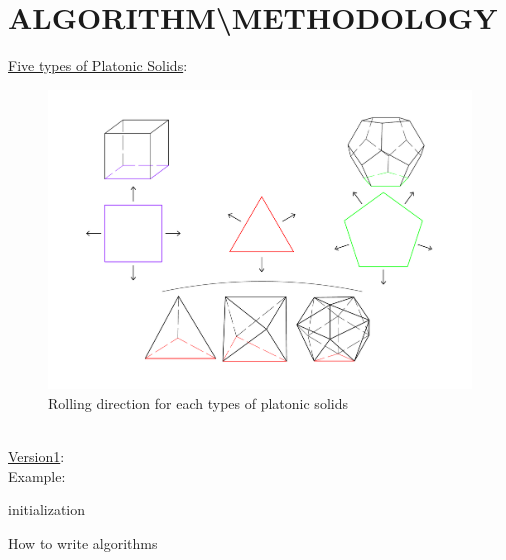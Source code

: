 \section{ALGORITHM\textbackslash METHODOLOGY}
\noindent\uline{Five types of Platonic Solids}: 
\begin{figure}[h]
\centering
	\includegraphics[width=1\textwidth]{image/rollingDir2.pdf}
	\caption{Rolling direction for each types of platonic solids}
	\label{fig:platonicSolids}
\end{figure}\\
%
% 
%
%
%
%
%
\uline{Version1}: \\

Example:\\
\begin{algorithm}[H]
\SetAlgoLined
{}
 initialization\;
 \caption{How to write algorithms}
\end{algorithm}


